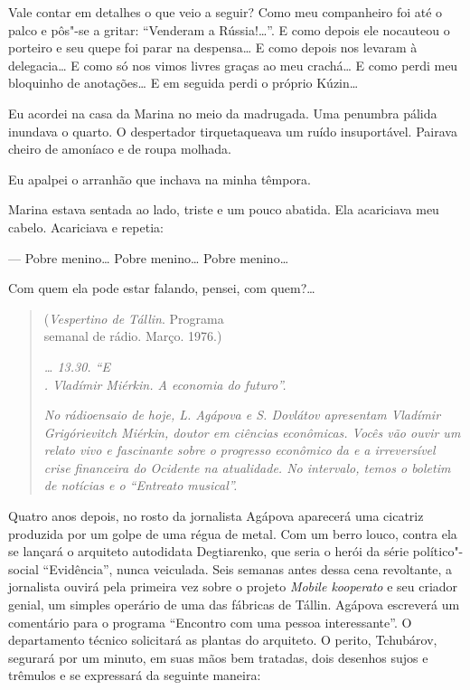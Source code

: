 Vale contar em detalhes o que veio a seguir? Como meu companheiro foi
até o palco e pôs"-se a gritar: ``Venderam a Rússia!\ldots{}''. E como depois
ele nocauteou o porteiro e seu quepe foi parar na despensa\ldots{} E como
depois nos levaram à delegacia\ldots{} E como só nos vimos livres graças ao
meu crachá\ldots{} E como perdi meu bloquinho de anotações\ldots{} E em seguida
perdi o próprio Kúzin\ldots{}

Eu acordei na casa da Marina no meio da madrugada. Uma penumbra pálida
inundava o quarto. O despertador tirquetaqueava um ruído insuportável.
Pairava cheiro de amoníaco e de roupa molhada.

Eu apalpei o arranhão que inchava na minha têmpora.

Marina estava sentada ao lado, triste e um pouco abatida. Ela acariciava
meu cabelo. Acariciava e repetia:

--- Pobre menino\ldots{} Pobre menino\ldots{} Pobre menino\ldots{}

Com quem ela pode estar falando, pensei, com quem?\ldots{}

\clearpage
\thispagestyle{empty}

\movetooddpage
\begin{center}
{}
\end{center}

\begin{quotation}
\begin{flushright}
(\emph{Vespertino de Tállin}. Programa\\semanal de rádio. Março. 1976.)
\end{flushright}
\vspace{4pt}
\hspace{-10pt}\emph{\ldots{} 13.30. ``E
\\. Vladímir
Miérkin. A economia do futuro''.}

\emph{No rádioensaio de hoje, L. Agápova e S. Dovlátov apresentam
Vladímir Grigórievitch Miérkin, doutor em ciências econômicas. Vocês vão
ouvir um relato vivo e fascinante sobre o progresso econômico da  e
a irreversível crise financeira do Ocidente na atualidade. No intervalo,
temos o boletim de notícias e o ``Entreato musical''.}
\end{quotation}

Quatro anos depois, no rosto da jornalista Agápova aparecerá uma
cicatriz produzida por um golpe de uma régua  de metal. Com um berro
louco, contra ela se lançará o arquiteto autodidata Degtiarenko, que
seria o herói da série político"-social ``Evidência'', nunca
veiculada. Seis semanas antes dessa cena revoltante, a jornalista ouvirá
pela primeira vez sobre o projeto \emph{Mobile kooperato} e seu criador
genial, um simples operário de uma das fábricas de Tállin. Agápova
escreverá um comentário para o programa ``Encontro com uma pessoa
interessante''. O departamento técnico solicitará as plantas do
arquiteto. O perito, Tchubárov, segurará por um minuto, em suas mãos bem
tratadas, dois desenhos sujos e trêmulos e se expressará da seguinte
maneira:

